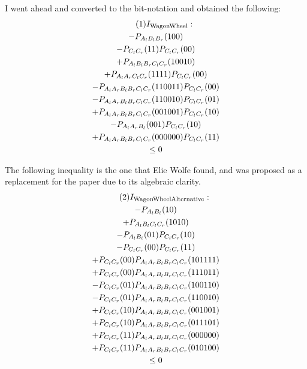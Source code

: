\documentclass[aps, 10pt, english, twoside, pra, nofootinbib, tightenlines, longbibliography, superscriptaddress]{revtex4-1}
\begin{document}
    I went ahead and converted to the bit-notation and obtained the following:
    \begin{equation*}
    \begin{gathered}
    \eq
    I\tsb{WagonWheel} : \\
    - P_{A_lB_lB_r}(100) \\
    - P_{C_lC_r}(11)P_{C_lC_r}(00) \\
    + P_{A_lB_lB_rC_lC_r}(10010) \\
    + P_{A_{l}A_{r}C_lC_r}(1111)P_{C_lC_r}(00)\\
    - P_{A_lA_rB_lB_rC_lC_r}(110011)P_{C_lC_r}(00) \\
    - P_{A_lA_rB_lB_rC_lC_r}(110010)P_{C_lC_r}(01) \\
    + P_{A_lA_rB_lB_rC_lC_r}(001001)P_{C_lC_r}(10) \\
    - P_{A_lA_rB_l}(001)P_{C_lC_r}(10) \\
    + P_{A_lA_rB_lB_rC_lC_r}(000000)P_{C_lC_r}(11) \\
    \leq 0
    \end{gathered}
    \end{equation*}

    The following inequality is the one that Elie Wolfe found, and was proposed as a replacement for the paper due to its algebraic clarity.
    \begin{equation*}
    \begin{gathered}
        \eq
        I\tsb{WagonWheelAlternative} : \\
        -P_{A_{l}B_{l}}(10) \\
        +P_{A_{l}B_{l}C_{l}C_{r}}(1010) \\
        -P_{A_{l}B_{l}}(01) P_{C_{l}C_{r}}(10) \\
        -P_{C_{l}C_{r}}(00) P_{C_{l}C_{r}}(11) \\
        +P_{C_{l}C_{r}}(00) P_{A_{l}A_{r}B_{l}B_{r}C_{l}C_{r}}(101111) \\
        +P_{C_{l}C_{r}}(00) P_{A_{l}A_{r}B_{l}B_{r}C_{l}C_{r}}(111011) \\
        -P_{C_{l}C_{r}}(01) P_{A_{l}A_{r}B_{l}B_{r}C_{l}C_{r}}(100110) \\
        -P_{C_{l}C_{r}}(01) P_{A_{l}A_{r}B_{l}B_{r}C_{l}C_{r}}(110010) \\
        +P_{C_{l}C_{r}}(10) P_{A_{l}A_{r}B_{l}B_{r}C_{l}C_{r}}(001001) \\
        +P_{C_{l}C_{r}}(10) P_{A_{l}A_{r}B_{l}B_{r}C_{l}C_{r}}(011101) \\
        +P_{C_{l}C_{r}}(11) P_{A_{l}A_{r}B_{l}B_{r}C_{l}C_{r}}(000000) \\
        +P_{C_{l}C_{r}}(11) P_{A_{l}A_{r}B_{l}B_{r}C_{l}C_{r}}(010100) \\
        \leq 0
    \end{gathered}
    \end{equation*}
\end{document}
